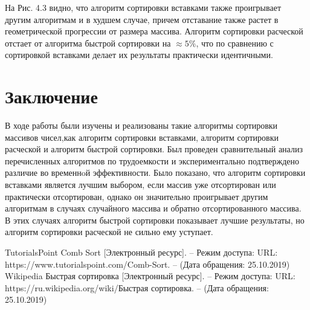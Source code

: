 \documentclass[a4paper,12pt]{report}
\begin{document}
\newpage
На Рис. 4.3 видно, что алгоритм сортировки вставками также проигрывает другим алгоритмам и в худшем случае, причем отставание также растет в геометрической прогрессии от размера массива. Алгоритм сортировки расческой отстает от алгоритма быстрой сортировки на $\approx 5\%$, что по сравнению с сортировкой вставками делает их результаты практически идентичными.

\chapter*{Заключение}
\hspace{0.6cm}В ходе работы были изучены и реализованы такие алгоритмы сортировки массивов чисел,как алгоритм сортировки вставками, алгоритм сортировки расческой и алгоритм быстрой сортировки. Был проведен сравнительный анализ перечисленных алгоритмов по трудоемкости и экспериментально подтверждено различие во временнoй эффективности. Было показано, что алгоритм сортировки вставками является лучшим выбором, если массив уже отсортирован или практически отсортирован, однако он значительно проигрывает другим алгоритмам в случаях случайного массива и обратно отсортированного массива. В этих случаях алгоритм быстрой сортировки показывает лучшие результаты, но алгоритм сортировки расческой не сильно ему уступает.

\newpage


\renewcommand\bibname{Список литературы}
\begin{thebibliography}{9} 
 TutorialsPoint Comb Sort [Электронный ресурс]. – Режим доступа: URL: https://www.tutorialspoint.com/Comb-Sort. – (Дата обращения: 25.10.2019)
 Wikipedia Быстрая сортировка [Электронный ресурс]. – Режим доступа: URL: https://ru.wikipedia.org/wiki/Быстрая сортировка. – (Дата обращения: 25.10.2019)
\end{thebibliography}
\end{document}
